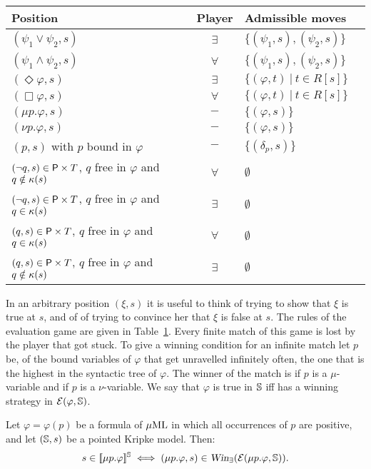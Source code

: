 \begin{table}
\centering
\begin{tabular}{|l|c|l|c|}
  \hline
  Position & Player & Admissible moves\\
  \hline
  $(\psi_1 \vee \psi_2,s)$ & $\exists$ & $\{(\psi_1,s),(\psi_2,s) \}$ \\
  $(\psi_1 \wedge \psi_2,s)$ & $\forall$ & $\{(\psi_1,s),(\psi_2,s) \}$ \\
  $(\Diamond\varphi,s)$ & $\exists$ & $\{(\varphi,t)\ |\ t \in R[s] \}$ \\
  $(\Box\varphi,s)$ & $\forall$ & $\{(\varphi,t)\ |\ t \in R[s] \}$ \\
  $(\mu p.\varphi,s)$ & $-$ & $\{(\varphi,s) \}$ \\
  $(\nu p.\varphi,s)$ & $-$ & $\{(\varphi,s) \}$ \\
  $(p,s)$ with $p$ bound in $\varphi$ & $-$ & $\{(\delta_p,s) \}$ \\
  $(\lnot q,s) \in \mathsf{P} \times T$, $q$ free in $\varphi$ and $q \notin \kappa(s)$ & $\forall$ & $\emptyset$\\
  $(\lnot q,s) \in \mathsf{P} \times T$, $q$ free in $\varphi$ and $q \in \kappa(s)$ & $\exists$ & $\emptyset$\\
  $(q,s) \in \mathsf{P} \times T$, $q$ free in $\varphi$ and $q \in \kappa(s)$ & $\forall$ & $\emptyset$\\
  $(q,s) \in \mathsf{P} \times T$, $q$ free in $\varphi$ and $q \notin \kappa(s)$ & $\exists$ & $\emptyset$\\
  \hline
\end{tabular}
\caption{}
\label{egame_mucalc}
\end{table}
%

In an arbitrary position $(\xi,s)$ it is useful to think of
\eloise trying to show that $\xi$ is true at $s$, and of \abelard of trying to convince her that $\xi$ is false at $s$. The rules of the evaluation game are given in Table~\ref{egame_mucalc}.
Every finite match of this game is lost by the player that got stuck. To give a winning condition for an infinite match let $p$ be, of the bound variables of $\varphi$ that get unravelled infinitely often, the one that is the highest in the syntactic tree of $\varphi$. The winner of the match is \abelard if $p$ is a $\mu$-variable and \eloise if $p$ is a $\nu$-variable. We say that $\varphi$ is true in $\mathbb{S}$ iff \eloise has a winning strategy in $\mathcal{E}(\varphi,\mathbb{S})$.

\begin{proposition}\label{p:unfold=evalgame}
Let $\varphi = \varphi(p)$ be a formula of $\mu\mathrm{ML}$ in which all occurrences of $p$ are positive, and let $(\mathbb{S},s)$ be a pointed Kripke model. Then:
\begin{equation}
\label{eq:adeq3}
s \in \mng{\mu p.\varphi}^{\model} %
\iff (\mu p.\varphi,s) \in \win_{\eloise}(\egame(\mu p.\varphi,\model)).
\end{equation}
\end{proposition}

